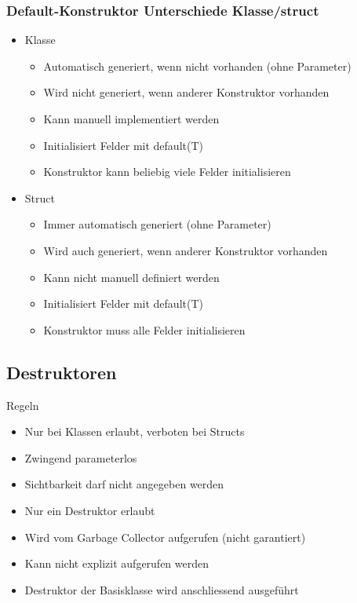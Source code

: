 \documentclass[
a4paper,
oneside,
10pt,
fleqn,
headsepline,
toc=listofnumbered, 
bibliography=totocnumbered]{scrartcl}
\begin{document}
\subsubsection{Default-Konstruktor Unterschiede Klasse/struct}
\begin{itemize}
    \item Klasse
    \begin{itemize}
        \item Automatisch generiert, wenn nicht vorhanden (ohne Parameter)
        \item Wird nicht generiert, wenn anderer Konstruktor vorhanden
        \item Kann manuell implementiert werden
        \item Initialisiert Felder mit default(T)
        \item Konstruktor kann beliebig viele Felder initialisieren
    \end{itemize}
    \item Struct
    \begin{itemize}
        \item Immer automatisch generiert (ohne Parameter)
        \item Wird auch generiert, wenn anderer Konstruktor vorhanden
        \item Kann nicht manuell definiert werden
        \item Initialisiert Felder mit default(T)
        \item Konstruktor muss alle Felder initialisieren
    \end{itemize}
\end{itemize}

\subsection{Destruktoren}
Regeln
\begin{itemize}
    \item Nur bei Klassen erlaubt, verboten bei Structs
    \item Zwingend parameterlos
    \item Sichtbarkeit darf nicht angegeben werden
    \item Nur ein Destruktor erlaubt
    \item Wird vom Garbage Collector aufgerufen (nicht garantiert)
    \item Kann nicht explizit aufgerufen werden
    \item Destruktor der Basisklasse wird anschliessend ausgeführt
\end{itemize}
\end{document}

